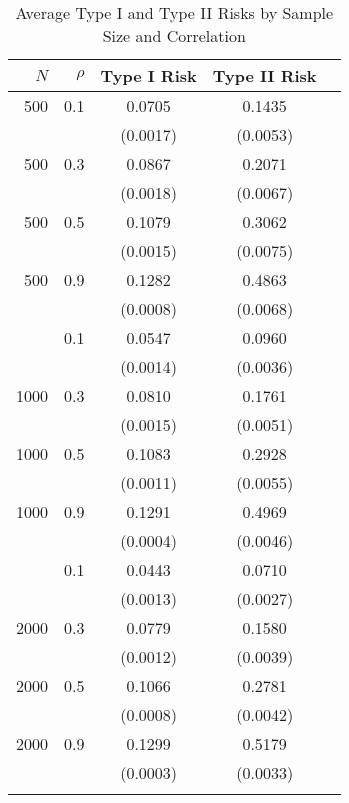 \begin{table}
\caption{Average Type I and Type II Risks by Sample Size and Correlation}
\centering
\begin{tabular}{rrccc}
\toprule
$N$ & $\rho$ & \multicolumn{1}{c}{Type I Risk} & \multicolumn{1}{c}{Type II Risk} \\
\midrule
500 & 0.1 & 0.0705 & 0.1435 \\
& & (0.0017) & (0.0053) \\
500 & 0.3 & 0.0867 & 0.2071 \\
& & (0.0018) & (0.0067) \\
500 & 0.5 & 0.1079 & 0.3062 \\
& & (0.0015) & (0.0075) \\
500 & 0.9 & 0.1282 & 0.4863 \\
& & (0.0008) & (0.0068) \\
\addlinespace
1000 & 0.1 & 0.0547 & 0.0960 \\
& & (0.0014) & (0.0036) \\
1000 & 0.3 & 0.0810 & 0.1761 \\
& & (0.0015) & (0.0051) \\
1000 & 0.5 & 0.1083 & 0.2928 \\
& & (0.0011) & (0.0055) \\
1000 & 0.9 & 0.1291 & 0.4969 \\
& & (0.0004) & (0.0046) \\
\addlinespace
2000 & 0.1 & 0.0443 & 0.0710 \\
& & (0.0013) & (0.0027) \\
2000 & 0.3 & 0.0779 & 0.1580 \\
& & (0.0012) & (0.0039) \\
2000 & 0.5 & 0.1066 & 0.2781 \\
& & (0.0008) & (0.0042) \\
2000 & 0.9 & 0.1299 & 0.5179 \\
& & (0.0003) & (0.0033) \\
\addlinespace
\bottomrule
\end{tabular}
\end{table}
